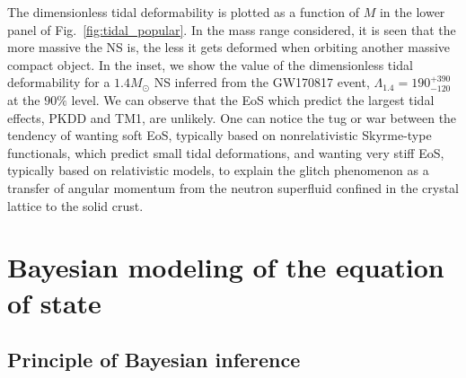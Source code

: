 The dimensionless tidal deformability is plotted as a function of $M$ in the 
lower panel of Fig.~\ref{fig:tidal_popular}. In the mass range considered, it 
is seen that the more massive the NS is, the less it gets deformed when 
orbiting another massive compact object. In the inset, we show the value of
the dimensionless tidal deformability for a $1.4M_\odot$ NS inferred from the 
GW170817 event, $\Lambda_{1.4} = 190_{-120}^{+390}$ at the $90\%$ level. We can
observe that the EoS which predict the largest tidal effects, PKDD and TM1, are 
unlikely. One can notice the tug or war between the tendency of wanting soft 
EoS, typically based on nonrelativistic Skyrme-type functionals, which predict 
small tidal deformations, and wanting very stiff EoS, typically based on 
relativistic models, to explain the glitch phenomenon as a transfer of angular
momentum from the neutron superfluid confined in the crystal lattice to the 
solid crust.

\section{Bayesian modeling of the equation of state} %


\subsection{Principle of Bayesian inference} %

